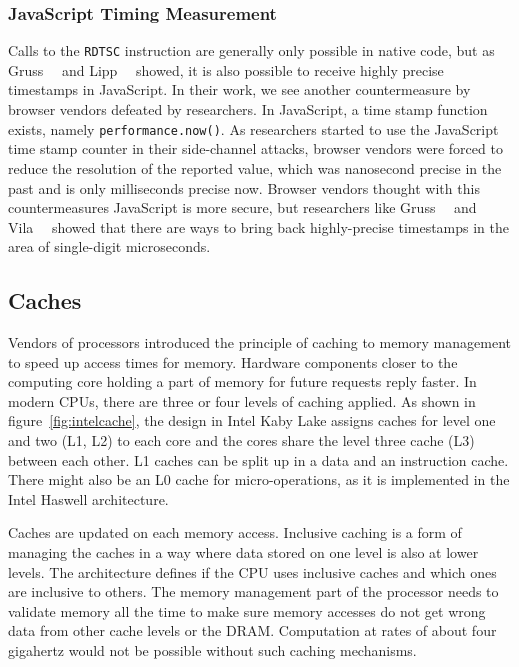 \subsubsection{JavaScript Timing Measurement}

Calls to the \texttt{RDTSC} instruction are generally only possible in native
code, but as Gruss~\etal~\cite{memdedupjs} and Lipp~\etal~\cite{keytimejs}
showed, it is also possible to receive highly precise timestamps in JavaScript.
In their work, we see another countermeasure by browser vendors defeated by
researchers. In JavaScript, a time stamp function exists, namely
\texttt{performance.now()}. As researchers started to use the JavaScript time
stamp counter in their side-channel attacks, browser vendors were forced to
reduce the resolution of the reported value, which was nanosecond precise in the
past and is only milliseconds precise now. Browser vendors thought with this
countermeasures JavaScript is more secure, but researchers like
Gruss~\etal~\cite{memdedupjs} and Vila~\etal~\cite{loophole} showed that there
are ways to bring back highly-precise timestamps in the area of single-digit
microseconds.

\subsection{Caches}

Vendors of processors introduced the principle of caching to memory management
to speed up access times for memory. Hardware components closer to the computing
core holding a part of memory for future requests reply faster. In modern CPUs,
there are three or four levels of caching applied. As shown in
figure~\ref{fig:intelcache}, the design in Intel Kaby Lake assigns caches for
level one and two (L1, L2) to each core and the cores share the level three
cache (L3) between each other. L1 caches can be split up in a data and an
instruction cache. There might also be an L0 cache for micro-operations, as it
is implemented in the Intel Haswell architecture.

Caches are updated on each memory access. Inclusive caching is a form of
managing the caches in a way where data stored on one level is also at lower
levels. The architecture defines if the CPU uses inclusive caches and which ones
are inclusive to others. The memory management part of the processor needs to
validate memory all the time to make sure memory accesses do not get wrong data
from other cache levels or the DRAM. Computation at rates of about four
gigahertz would not be possible without such caching mechanisms.

